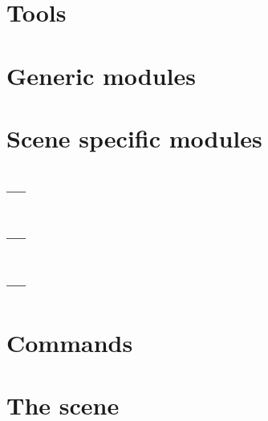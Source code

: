 \documentclass{manual}
\begin{document}



\chapter{Tools \label{tools}}





\chapter{Generic modules \label{modules1}}

\localmoduletable























\chapter{Scene specific modules \label{modules2}}

\localmoduletable


\section{ --- }



\section{ --- }
\section{ --- }


\chapter{Commands \label{commands}}


\chapter{The scene\label{scene}}
\end{document}
